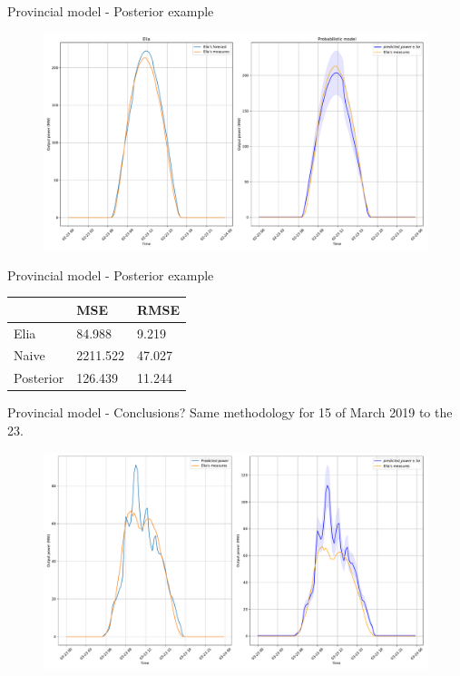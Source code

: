 \documentclass[12pt]{beamer}
\begin{document}
\begin{frame}{Provincial model - Posterior example}
	\begin{figure}
	    \centering
	    \includegraphics[width=.85\textwidth]{resources/pdf/comparison_elia_post.pdf}
	    \label{fig:comparison_elia_post}
	\end{figure}
\end{frame}

\begin{frame}{Provincial model - Posterior example}
	\begin{table}
    	\centering
        \begin{tabular}{l|l|l}
                  & MSE      & RMSE   \\ \hline
        Elia      & 84.988 & 9.219    \\ \hline
        Naive     & 2211.522 & 47.027 \\ \hline
        Posterior & 126.439  & 11.244
        \end{tabular}
        \label{tab:elia_post}
    \end{table}
\end{frame}

\begin{frame}{Provincial model - Conclusions?}
    Same methodology for 15 of March 2019 to the 23.
    \begin{figure}
        \centering
        \includegraphics[width=.85\textwidth]{resources/pdf/bad_naive_post.pdf}
        \label{fig:bad_naive_post}
    \end{figure}
\end{frame}
\end{document}
